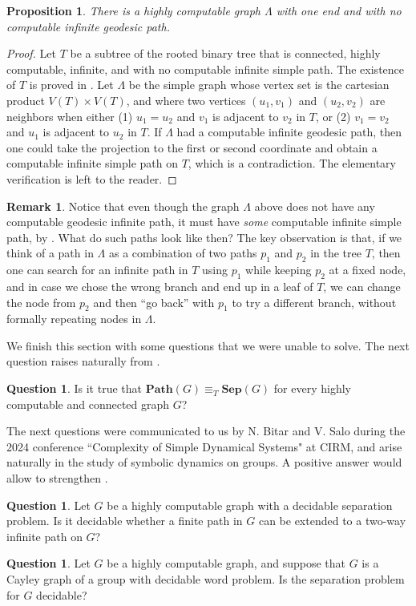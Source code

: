 \documentclass[10pt,A4]{amsart}
\newtheorem{prop}[thm]{Proposition}
\theoremstyle{definition}
\newtheorem{Q}[thm]{Question}
\newtheorem{rmk}[thm]{Remark}
\newtheorem{question}[theorem]{Question}
\theoremstyle{definition}
\newcommand{\sep}[1]{\mathbf{Sep}({#1})}
\newcommand{\Path}[1]{\mathbf{Path}({#1})}
\begin{document}
\begin{prop}\label{graph-with-no-computable-infinite-geodesic-paths}
    There is a highly computable graph $\Lambda$ with one end and with no computable infinite geodesic path. 
\end{prop}
\begin{proof}
    Let $T$ be a subtree of the rooted binary tree that is connected, highly computable, infinite, and with no computable infinite simple path. The existence of $T$ is proved in \cite{jockusch_pi_1972}. Let $\Lambda$ be the simple graph whose vertex set is the cartesian product $V(T)\times V(T)$, and where two vertices $(u_1,v_1)$ and $(u_2,v_2)$ are neighbors when either (1) $u_1=u_2$ and $v_1$ is adjacent to $v_2$ in $T$, or (2) $v_1=v_2$ and $u_1$ is adjacent to $u_2$ in $T$. If $\Lambda$ had a computable infinite geodesic path, then one could take the projection to the first or second coordinate and obtain a computable infinite simple path on $T$, which is a contradiction.  The elementary verification is left to the reader.  
\end{proof}
\begin{rmk}
Notice that even though the graph $\Lambda$ above does not have any computable geodesic infinite path, it must have \emph{some} computable infinite simple path, by .  What do such paths look like then? The key observation is that, if we think of a path in $\Lambda$ as a combination of two paths $p_1$ and $p_2$ in the tree $T$, then one can search for an infinite path in $T$ using $p_1$ while keeping $p_2$ at a fixed node, and in case we chose the wrong branch and end up in a leaf of $T$, we can change the node from $p_2$ and then “go back'' with $p_1$ to try a different branch, without formally repeating nodes in $\Lambda$.  
\end{rmk}
We finish this section with some  questions that we were unable to solve. The next question raises naturally from .
\begin{Q}
    Is it true that $\Path{G}\equiv_T\sep{G}$ for every highly computable and connected graph $G$? %
\end{Q}
The next questions  
were communicated to us by N. Bitar and V. Salo during the 2024 conference ``Complexity of Simple Dynamical Systems" at CIRM, and arise naturally in the study of symbolic dynamics on groups. A positive answer would allow to strengthen \cite[Proposition 1.4]{aubrun_self-avoiding_2024}.
\begin{question}
    Let $G$ be a highly computable graph with a decidable separation problem. Is it decidable whether a finite path in $G$ can be extended to a two-way infinite path on $G$? 
\end{question}
\begin{question}
    Let $G$ be a highly computable graph, and suppose that $G$ is a Cayley graph of a group with decidable word problem. Is the separation problem for $G$ decidable?  
\end{question}
\end{document}
